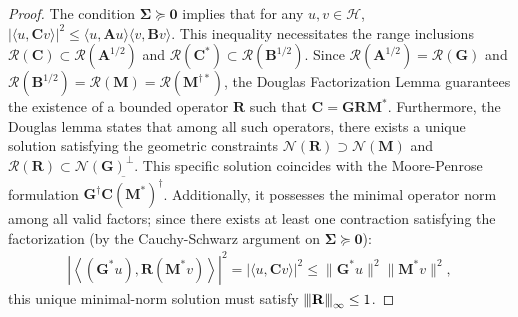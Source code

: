 \documentclass[noinfoline]{imsart}\setcounter{tocdepth}{2}
\newcommand{\m}[1]{\mathbf{#1}}
\renewcommand{\c}[1]{\mathcal{#1}}
\newcommand{\innpr}[2]{{\left\langle {#1},{#2}\right\rangle}}
\newcommand{\vertiii}[1]{{\left\vert\kern-0.25ex\left\vert\kern-0.25ex\left\vert #1 
    \right\vert\kern-0.25ex\right\vert\kern-0.25ex\right\vert}} %
\theoremstyle{plain}
\begin{document}
\begin{proof}
The condition $\m{\Sigma} \succeq \m{0}$ implies that for any $u, v \in \c{H}$, $|\langle u, \m{C} v \rangle|^2 \le \langle u, \m{A} u \rangle \langle v, \m{B} v \rangle$. This inequality necessitates the range inclusions $\c{R}(\m{C}) \subset \c{R}(\m{A}^{1/2})$ and $\c{R}(\m{C}^*) \subset \c{R}(\m{B}^{1/2})$. 
Since $\c{R}(\m{A}^{1/2}) = \c{R}(\m{G})$ and $\c{R}(\m{B}^{1/2}) = \c{R}(\m{M}) = \c{R}(\m{M}^{\dagger *})$, the Douglas Factorization Lemma guarantees the existence of a bounded operator $\m{R}$ such that $\m{C} = \m{G} \m{R} \m{M}^{*}$. 
Furthermore, the Douglas lemma states that among all such operators, there exists a unique solution satisfying the geometric constraints $\c{N}(\m{R}) \supset \c{N}(\m{M})$ and $\c{R}(\m{R}) \subset \c{N}(\m{G})^{\perp}$. This specific solution coincides with the Moore-Penrose formulation $\overline{\m{G}^{\dagger} \m{C} (\m{M}^{*})^{\dagger}}$. Additionally, it possesses the minimal operator norm among all valid factors; since there exists at least one contraction satisfying the factorization (by the Cauchy-Schwarz argument on $\m{\Sigma} \succeq \m{0}$):
\begin{align*}
    |\innpr{(\m{G}^{*} u)}{\m{R}(\m{M}^{*} v)}|^{2} = |\langle u, \m{C} v \rangle|^2 \le \| \m{G}^{*} u\|^{2} \|\m{M}^{*} v\|^{2},
\end{align*}
this unique minimal-norm solution must satisfy $\vertiii{\m{R}}_{\infty} \le 1$.
\end{proof}
\end{document}
